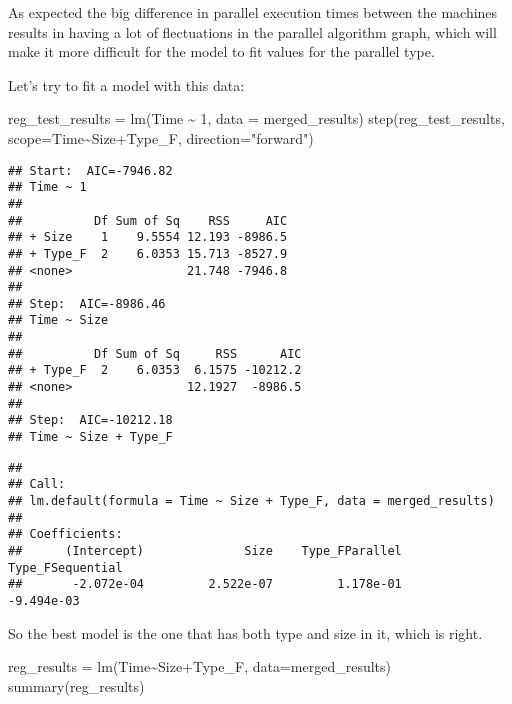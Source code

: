 \documentclass[
]{article}
\newenvironment{Shaded}{\begin{snugshade}}{\end{snugshade}}
\newcommand{\AttributeTok}[1]{\textcolor[rgb]{0.77,0.63,0.00}{#1}}
\newcommand{\DecValTok}[1]{\textcolor[rgb]{0.00,0.00,0.81}{#1}}
\newcommand{\FunctionTok}[1]{\textcolor[rgb]{0.00,0.00,0.00}{#1}}
\newcommand{\NormalTok}[1]{#1}
\newcommand{\OtherTok}[1]{\textcolor[rgb]{0.56,0.35,0.01}{#1}}
\newcommand{\SpecialCharTok}[1]{\textcolor[rgb]{0.00,0.00,0.00}{#1}}
\newcommand{\StringTok}[1]{\textcolor[rgb]{0.31,0.60,0.02}{#1}}
\begin{document}
As expected the big difference in parallel execution times between the
machines results in having a lot of flectuations in the parallel
algorithm graph, which will make it more difficult for the model to fit
values for the parallel type.

Let's try to fit a model with this data:

\begin{Shaded}
\begin{Highlighting}[]
\NormalTok{reg\_test\_results }\OtherTok{=} \FunctionTok{lm}\NormalTok{(Time }\SpecialCharTok{\textasciitilde{}} \DecValTok{1}\NormalTok{, }\AttributeTok{data =}\NormalTok{ merged\_results)}
\FunctionTok{step}\NormalTok{(reg\_test\_results, }\AttributeTok{scope=}\NormalTok{Time}\SpecialCharTok{\textasciitilde{}}\NormalTok{Size}\SpecialCharTok{+}\NormalTok{Type\_F, }\AttributeTok{direction=}\StringTok{"forward"}\NormalTok{)}
\end{Highlighting}
\end{Shaded}

\begin{verbatim}
## Start:  AIC=-7946.82
## Time ~ 1
## 
##          Df Sum of Sq    RSS     AIC
## + Size    1    9.5554 12.193 -8986.5
## + Type_F  2    6.0353 15.713 -8527.9
## <none>                21.748 -7946.8
## 
## Step:  AIC=-8986.46
## Time ~ Size
## 
##          Df Sum of Sq     RSS      AIC
## + Type_F  2    6.0353  6.1575 -10212.2
## <none>                12.1927  -8986.5
## 
## Step:  AIC=-10212.18
## Time ~ Size + Type_F
\end{verbatim}

\begin{verbatim}
## 
## Call:
## lm.default(formula = Time ~ Size + Type_F, data = merged_results)
## 
## Coefficients:
##      (Intercept)              Size    Type_FParallel  Type_FSequential  
##       -2.072e-04         2.522e-07         1.178e-01        -9.494e-03
\end{verbatim}

So the best model is the one that has both type and size in it, which is
right.

\begin{Shaded}
\begin{Highlighting}[]
\NormalTok{reg\_results }\OtherTok{=} \FunctionTok{lm}\NormalTok{(Time}\SpecialCharTok{\textasciitilde{}}\NormalTok{Size}\SpecialCharTok{+}\NormalTok{Type\_F, }\AttributeTok{data=}\NormalTok{merged\_results)}
\FunctionTok{summary}\NormalTok{(reg\_results)}
\end{Highlighting}
\end{Shaded}
\end{document}
